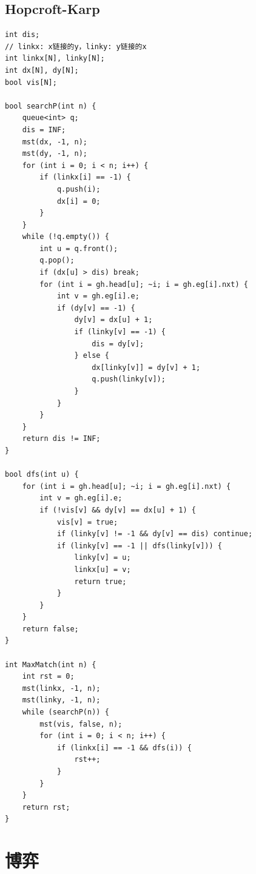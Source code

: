 \documentclass[twoside]{article}
\begin{document}
\subsection{Hopcroft-Karp}
\begin{lstlisting}
int dis;
// linkx: x链接的y，linky: y链接的x
int linkx[N], linky[N];
int dx[N], dy[N];
bool vis[N];

bool searchP(int n) {
    queue<int> q;
    dis = INF;
    mst(dx, -1, n);
    mst(dy, -1, n);
    for (int i = 0; i < n; i++) {
        if (linkx[i] == -1) {
            q.push(i);
            dx[i] = 0;
        }
    }
    while (!q.empty()) {
        int u = q.front();
        q.pop();
        if (dx[u] > dis) break;
        for (int i = gh.head[u]; ~i; i = gh.eg[i].nxt) {
            int v = gh.eg[i].e;
            if (dy[v] == -1) {
                dy[v] = dx[u] + 1;
                if (linky[v] == -1) {
                    dis = dy[v];
                } else {
                    dx[linky[v]] = dy[v] + 1;
                    q.push(linky[v]);
                }
            }
        }
    }
    return dis != INF;
}

bool dfs(int u) {
    for (int i = gh.head[u]; ~i; i = gh.eg[i].nxt) {
        int v = gh.eg[i].e;
        if (!vis[v] && dy[v] == dx[u] + 1) {
            vis[v] = true;
            if (linky[v] != -1 && dy[v] == dis) continue;
            if (linky[v] == -1 || dfs(linky[v])) {
                linky[v] = u;
                linkx[u] = v;
                return true;
            }
        }
    }
    return false;
}

int MaxMatch(int n) {
    int rst = 0;
    mst(linkx, -1, n);
    mst(linky, -1, n);
    while (searchP(n)) {
        mst(vis, false, n);
        for (int i = 0; i < n; i++) {
            if (linkx[i] == -1 && dfs(i)) {
                rst++;
            }
        }
    }
    return rst;
}\end{lstlisting}
\clearpage\section{博弈}
\end{document}
